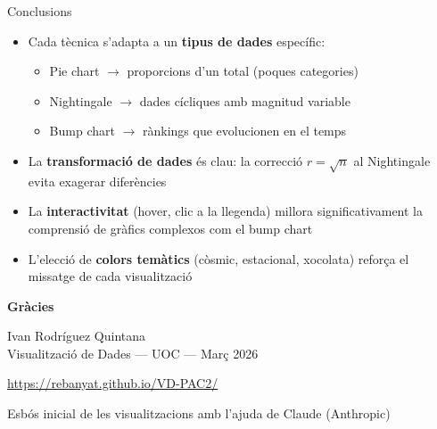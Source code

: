 \documentclass[aspectratio=169, 11pt]{beamer}
\begin{document}
\begin{frame}{Conclusions}
\begin{itemize}
    \item Cada tècnica s'adapta a un \textbf{tipus de dades} específic:
    \begin{itemize}
        \item Pie chart $\rightarrow$ proporcions d'un total (poques categories)
        \item Nightingale $\rightarrow$ dades cícliques amb magnitud variable
        \item Bump chart $\rightarrow$ rànkings que evolucionen en el temps
    \end{itemize}

    \vspace{0.8em}
    \item La \textbf{transformació de dades} és clau: la correcció $r = \sqrt{n}$ al Nightingale evita exagerar diferències

    \vspace{0.8em}
    \item La \textbf{interactivitat} (hover, clic a la llegenda) millora significativament la comprensió de gràfics complexos com el bump chart

    \vspace{0.8em}
    \item L'elecció de \textbf{colors temàtics} (còsmic, estacional, xocolata) reforça el missatge de cada visualització
\end{itemize}
\end{frame}

\begin{frame}{}
\centering
\vspace{3em}
{\Large \textbf{Gràcies}}

\vspace{2em}
Ivan Rodríguez Quintana\\
\small Visualització de Dades --- UOC --- Març 2026

\vspace{1em}
\footnotesize
\url{https://rebanyat.github.io/VD-PAC2/}

\vspace{1em}
{\scriptsize\color{uocgris} Esbós inicial de les visualitzacions amb l'ajuda de Claude (Anthropic)}
\end{frame}
\end{document}
